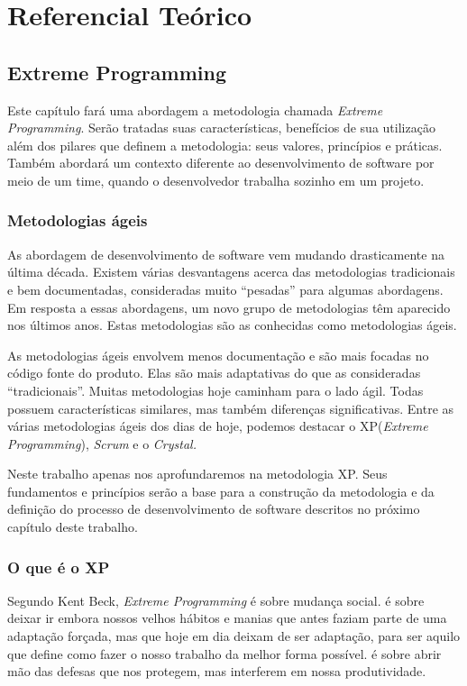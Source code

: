 \part{Referencial Teórico}

\chapter[Extreme Programming]{Extreme Programming}

Este capítulo fará uma abordagem a metodologia chamada \textit{Extreme Programming}. Serão tratadas suas características, benefícios de sua utilização além dos pilares que definem a metodologia: seus valores, princípios e práticas.
Também abordará um contexto diferente ao desenvolvimento de software por meio de um time, quando o desenvolvedor trabalha sozinho em um projeto.

\section{Metodologias ágeis}

As abordagem de desenvolvimento de software vem mudando drasticamente na última década. Existem várias desvantagens acerca das metodologias tradicionais e bem documentadas, consideradas muito “pesadas” para algumas abordagens. Em resposta a essas abordagens, um novo grupo de metodologias têm aparecido nos últimos anos. Estas metodologias são as conhecidas como metodologias ágeis. \cite{Agarwal:2008}

As metodologias ágeis envolvem menos documentação e são mais focadas no código fonte do produto. Elas são mais adaptativas do que as consideradas “tradicionais”. Muitas metodologias hoje caminham para o lado ágil. Todas possuem características similares, mas também diferenças significativas. Entre as várias metodologias ágeis dos dias de hoje, podemos destacar o XP(\textit{Extreme Programming}), \textit{Scrum} e o \textit{Crystal.} \cite{Agarwal:2008}

Neste trabalho apenas nos aprofundaremos na metodologia XP. Seus fundamentos e princípios serão a base para a construção da metodologia e da definição do processo de desenvolvimento de software descritos no próximo capítulo deste trabalho.

\section{O que é o XP}

Segundo Kent Beck, \cite{Beck:2004} \textit{Extreme Programming} é sobre mudança social. é sobre deixar ir embora nossos velhos hábitos e manias que antes faziam parte de uma adaptação forçada, mas que hoje em dia deixam de ser adaptação, para ser aquilo que define como fazer o nosso trabalho da melhor forma possível. é sobre abrir mão das defesas que nos protegem, mas interferem em nossa produtividade.

